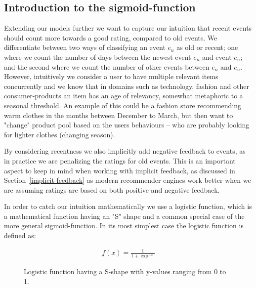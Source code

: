 \subsection{Introduction to the sigmoid-function}

Extending our models further we want to capture our intuition that recent
events should count more towards a good rating, compared to old events. We
differentiate between two ways of classifying an event $e_u$ as old or recent;
one where we count the number of days between the newest event $e_n$ and event
$e_u$; and the second where we count the number of other events between $e_n$
and $e_u$. However, intuitively we consider a user to have multiple relevant
items concurrently and we know that in domains such as technology, fashion and
other consumer-products an item has an age of relevancy, somewhat metaphoric to
a seasonal threshold. An example of this could be a fashion store recommending
warm clothes in the months between December to March, but then want to "change"
product pool based on the users behaviours – who are probably looking for
lighter clothes (changing season).

By considering recentness we also implicitly add negative feedback to events,
as in practice we are penalizing the ratings for old events. This is an
important aspect to keep in mind when working with implicit feedback, as
discussed in Section~\ref{implicit-feedback} as modern recommender engines work
better when we are assuming ratings are based on both positive and negative
feedback.

In order to catch our intuition mathematically we use a logistic function, which
is a mathematical function having an "S" shape and a common special case of the
more general sigmoid-function. In its most simplest case the logistic function
is defined as:

\begin{figure}[H]
  \centering
  \noindent\begin{minipage}{.45\textwidth}
  \end{minipage}
  \begin{minipage}{.45\textwidth}
  \begin{align}
    \label{logistic-function}
    f(x) = \frac{1}{1+\exp^{-x}}
  \end{align}
  \end{minipage}
  \caption{Logistic function having a S-shape with y-values ranging
  from 0 to 1.}
\end{figure}

